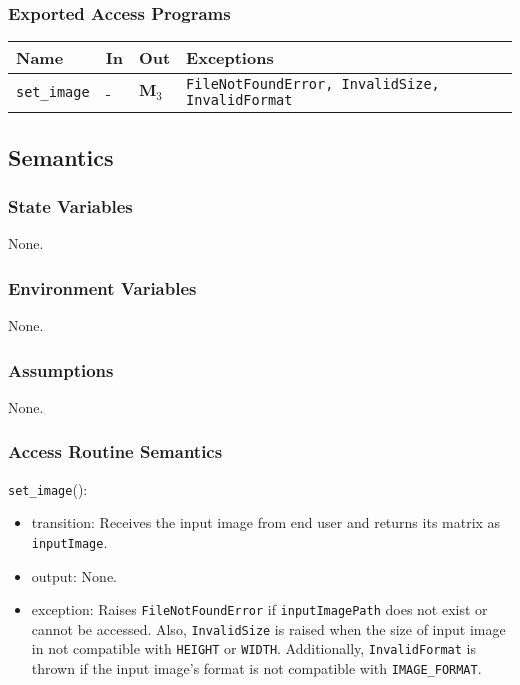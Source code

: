 \documentclass[12pt, titlepage]{article}
\def\code#1{\texttt{#1}}
\begin{document}
\subsubsection{Exported Access Programs}

\begin{center}
\begin{tabular}{p{3.5cm} p{4cm} p{4cm} p{4cm}}
\hline
\textbf{Name} & \textbf{In} & \textbf{Out} & \textbf{Exceptions} \\
\hline
\code{set\_image} & - & $\mathbf{M}_{3}$ & \code{FileNotFoundError, InvalidSize, InvalidFormat} \\
\hline
\end{tabular}
\end{center}

\subsection{Semantics}

\subsubsection{State Variables}
None.

\subsubsection{Environment Variables}
None.

\subsubsection{Assumptions}
None.

\subsubsection{Access Routine Semantics}

\noindent \code{set\_image}():
\begin{itemize}
  \item transition: Receives the input image from end user and returns its matrix as \code{inputImage}.
  \item output: None.
  \item exception: Raises \code{FileNotFoundError} if \code{inputImagePath} does not exist or cannot be accessed. 
  Also, \code{InvalidSize} is raised when the size of input image in not compatible with \code{HEIGHT} or 
  \code{WIDTH}. Additionally, \code{InvalidFormat} is thrown if the input image's format is 
  not compatible with \code{IMAGE\_FORMAT}.
\end{itemize}
\end{document}
